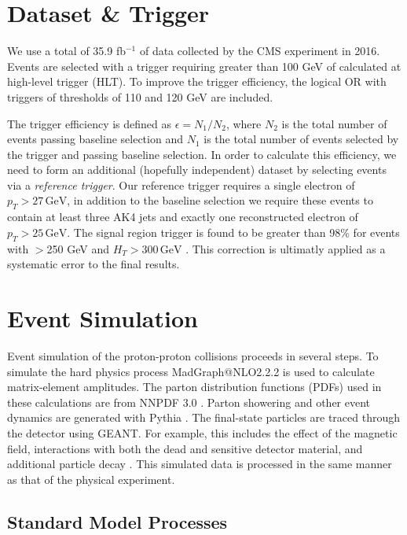 \section{Dataset \& Trigger}

We use a total of 35.9 fb$^{-1}$ of data collected by the CMS experiment in 2016. Events are selected with a trigger requiring greater than 100 GeV of \ptmiss calculated at high-level trigger (HLT). To improve the trigger efficiency, the logical OR with triggers of thresholds of 110 and 120 GeV are included.

The trigger efficiency is defined as $\epsilon = N_{1}/N_{2}$, where $N_{2}$ is the total number of events passing baseline selection and $N_{1}$ is the total number of events selected by the trigger and passing baseline selection. In order to calculate this efficiency, we need to form an additional (hopefully independent) dataset by selecting events via a \textit{reference trigger}. Our reference trigger requires a single electron of $p_{T}>27\,\textrm{GeV}$, in addition to the baseline selection we require these events to contain at least three AK4 jets and exactly one reconstructed electron of $p_{T}>25\,\textrm{GeV}$. The signal region trigger is found to be greater than 98\% for events with \ptmiss$>$250 GeV and $H_{T}>300\,\textrm{GeV}$ \cite{CMS-SUS-16-033}. This correction is ultimatly applied as a systematic error to the final results.

\section{Event Simulation}

Event simulation of the proton-proton collisions proceeds in several steps. To simulate the hard physics process MadGraph@NLO2.2.2 \cite{Alwall:2014hca} is used to calculate matrix-element amplitudes. The parton distribution functions (PDFs) used in these calculations are from NNPDF 3.0 \cite{Ball:2014uwa}.
Parton showering and other event dynamics are generated with Pythia \cite{pythiacite}. The final-state particles are traced through the detector using GEANT. For example, this includes the effect of the magnetic field, interactions with both the dead and sensitive detector material, and additional particle decay \cite{Agostinelli:2002hh}. This simulated data is processed in the same manner as that of the physical experiment.

\subsection{Standard Model Processes}
\label{sec:smp}

